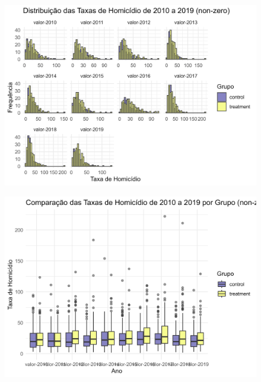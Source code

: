 \documentclass{beamer}
\begin{document}
\begin{frame}
	\begin{figure}
		\centering
		\includegraphics[width=1\linewidth]{figures/histog_hom_nonzero}
		\label{fig:histoghom}
	\end{figure}
	
\end{frame}

\begin{frame}
	\begin{figure}
		\centering
		\includegraphics[width=1\linewidth]{figures/boxplot_hom_nonzero}
		\label{fig:histoghom}
	\end{figure}
	
\end{frame}
\end{document}
